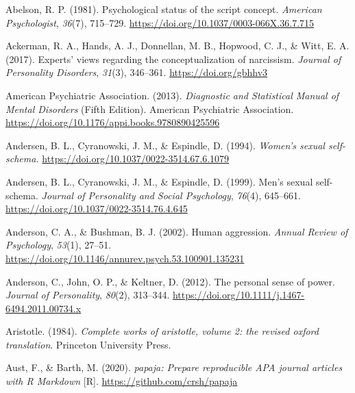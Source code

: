 \documentclass[
  donotrepeattitle,doc, 12pt, a4paper,floatsintext]{apa7}
\newlength{\cslhangindent}
\newlength{\cslentryspacingunit} %
\newenvironment{CSLReferences}[2] %
 {%
  \setlength{\parindent}{0pt}
  \ifodd #1
  \let\oldpar\par
  \def\par{\hangindent=\cslhangindent\oldpar}
  \fi
  \setlength{\parskip}{#2\cslentryspacingunit}
 }%
 {}
\begin{document}
\hypertarget{refs}{}
\begin{CSLReferences}{1}{0}
\leavevmode{}%
Abelson, R. P. (1981). Psychological status of the script concept. \emph{American Psychologist}, \emph{36}(7), 715--729. \url{https://doi.org/10.1037/0003-066X.36.7.715}

\leavevmode{}%
Ackerman, R. A., Hands, A. J., Donnellan, M. B., Hopwood, C. J., \& Witt, E. A. (2017). Experts' views regarding the conceptualization of narcissism. \emph{Journal of Personality Disorders}, \emph{31}(3), 346--361. \url{https://doi.org/gbhhv3}

\leavevmode{}%
American Psychiatric Association. (2013). \emph{Diagnostic and Statistical Manual of Mental Disorders} (Fifth Edition). American Psychiatric Association. \url{https://doi.org/10.1176/appi.books.9780890425596}

\leavevmode{}%
Andersen, B. L., Cyranowski, J. M., \& Espindle, D. (1994). \emph{Women's sexual self-schema.} \url{https://doi.org/10.1037/0022-3514.67.6.1079}

\leavevmode{}%
Andersen, B. L., Cyranowski, J. M., \& Espindle, D. (1999). Men's sexual self-schema. \emph{Journal of Personality and Social Psychology}, \emph{76}(4), 645--661. \url{https://doi.org/10.1037/0022-3514.76.4.645}

\leavevmode{}%
Anderson, C. A., \& Bushman, B. J. (2002). Human aggression. \emph{Annual Review of Psychology}, \emph{53}(1), 27--51. \url{https://doi.org/10.1146/annurev.psych.53.100901.135231}

\leavevmode{}%
Anderson, C., John, O. P., \& Keltner, D. (2012). The personal sense of power. \emph{Journal of Personality}, \emph{80}(2), 313--344. \url{https://doi.org/10.1111/j.1467-6494.2011.00734.x}

\leavevmode{}%
Aristotle. (1984). \emph{Complete works of aristotle, volume 2: the revised oxford translation}. Princeton University Press.

\leavevmode{}%
Aust, F., \& Barth, M. (2020). \emph{papaja: Prepare reproducible APA journal articles with R Markdown} {[}R{]}. \url{https://github.com/crsh/papaja}


\end{CSLReferences}
\end{document}
